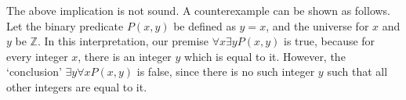 \documentclass[fleqn]{article}
\begin{document}
\begin{enumerate}
	The above implication is not sound. A counterexample can be shown as follows. Let the binary predicate \(P(x, y)\) be defined as \(y = x\), and the universe for \(x\) and \(y\) be \(\mathbb{Z}\). In this interpretation, our premise \(\forall x \exists y P(x, y)\) is true, because for every integer \(x\), there is an integer \(y\) which is equal to it. However, the `conclusion' \(\exists y \forall x P(x, y)\) is false, since there is no such integer \(y\) such that all other integers are equal to it.
\end{enumerate}
    
\end{document}

